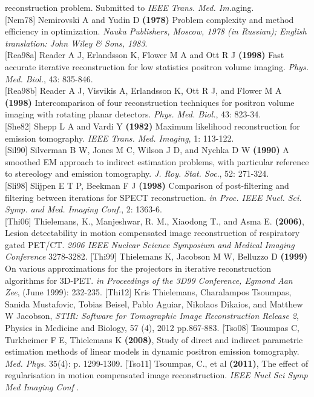 \documentclass{article}
\begin{document}
reconstruction problem. Submitted to \textit{IEEE Trans. Med. Im.}aging.\\
{[}Nem78{]} Nemirovski A and Yudin D \textbf{(1978)} Problem complexity 
and method efficiency in optimization. \textit{Nauka Publishers, 
Moscow, 1978 (in Russian); English translation: John Wiley \& 
Sons, 1983}.\\
{[}Rea98a{]} Reader A J, Erlandsson K, Flower M A and Ott R J \textbf{(1998)} 
Fast accurate iterative reconstruction for low statistics positron 
volume imaging. \textit{Phys. Med. Biol.}, 43: 835-846.\\
{[}Rea98b{]} Reader A J, Visvikis A, Erlandsson K, Ott R J, and Flower 
M A \textbf{(1998)} Intercomparison of four reconstruction techniques 
for positron volume imaging with rotating planar detectors. \textit{Phys. 
Med. Biol.}, 43: 823-34.\\
{[}She82{]} Shepp L A and Vardi Y \textbf{(1982)} Maximum likelihood reconstruction 
for emission tomography. \textit{IEEE Trans. Med. Imaging}, 1: 113-122.\\
{[}Sil90{]} Silverman B W, Jones M C, Wilson J D, and Nychka D W \textbf{(1990)} 
A smoothed EM approach to indirect estimation problems, with 
particular reference to stereology and emission tomography. \textit{J. 
Roy. Stat. Soc}., 52: 271-324.\\
{[}Sli98{]} Slijpen E T P, Beekman F J \textbf{(1998)} Comparison of post-filtering 
and filtering between iterations for SPECT reconstruction. \textit{in 
Proc. IEEE Nucl. Sci. Symp. and Med. Imaging Conf.}, 2: 1363-6.\\
{[}Thi06{]} Thielemans, K., Manjeshwar, R. M., Xiaodong T., and Asma E.
\textbf{(2006)}, Lesion detectability in motion compensated
image reconstruction of respiratory gated PET/CT. \textit { 2006 IEEE
Nuclear Science Symposium and Medical Imaging Conference} 3278-3282.
{[}Thi99{]} Thielemans K, Jacobson M W, Belluzzo D \textbf{(1999)} On 
various approximations for the projectors in iterative reconstruction 
algorithms for 3D-PET. \textit{in Proceedings of the 3D99 Conference, 
Egmond Aan Zee}, (June 1999): 232-235.
[Thi12] Kris Thielemans, Charalampos Tsoumpas, Sanida Mustafovic, Tobias Beisel, Pablo Aguiar, Nikolaos Dikaios, and Matthew W Jacobson,
\textit{STIR: Software for Tomographic Image Reconstruction Release 2},
Physics in Medicine and Biology, 57 (4), 2012 pp.867-883.
{[}Tso08{]} Tsoumpas C, Turkheimer F E, Thielemans K \textbf{(2008)},
Study of direct and indirect parametric estimation methods of linear
models in dynamic positron emission tomography. \textit{Med. Phys.} 35(4):
p. 1299-1309.
{[}Tso11{]} Tsoumpas, C., et al \textbf{(2011)}, The effect of
regularisation in motion compensated image reconstruction. \textit { IEEE
Nucl Sci Symp Med Imaging Conf }.
\end{document}

